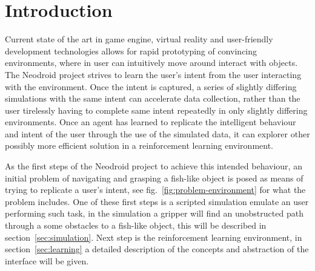 \section{Introduction}




Current state of the art in game engine, virtual reality and user-friendly development technologies allows for rapid prototyping of convincing environments, where in user can intuitively move around interact with objects. The Neodroid project strives to learn the user's intent from the user interacting with the environment. Once the intent is captured, a series of slightly differing simulations with the same intent can accelerate data collection, rather than the user tirelessly having to complete same intent repeatedly in only slightly differing environments. 
Once an agent has learned to replicate the intelligent behaviour and intent of the user through the use of the simulated data, it can explorer other possibly more efficient solution in a reinforcement learning environment.

As the first steps of the Neodroid project to achieve this intended behaviour, an initial problem of navigating and grasping a fish-like object is posed as means of trying to replicate a user's intent, see fig.~\ref{fig:problem-environment} for what the problem includes. One of these first steps is a scripted simulation emulate an user performing such task, in the simulation a gripper will find an unobstructed path through a some obstacles to a fish-like object, this will be described in section~\ref{sec:simulation}. Next step is the reinforcement learning environment, in section~\ref{sec:learning} a detailed description of the concepts and abstraction of the interface will be given.

